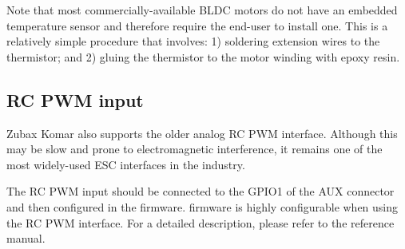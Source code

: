 Note that most commercially-available BLDC motors do not have an embedded temperature sensor and therefore
require the end-user to install one. This is a relatively simple procedure that involves: 1) soldering
extension wires to the thermistor; and 2) gluing the thermistor to the motor winding with epoxy resin.

\subsection{RC PWM input}
Zubax Komar also supports the older analog RC PWM interface. Although this may be slow and prone
to electromagnetic interference, it remains one of the most widely-used ESC interfaces in the industry.

The RC PWM input should be connected to the GPIO1 of the AUX connector and then configured in the firmware.
 firmware is highly configurable when using the RC PWM interface. For a detailed description,
please refer to the  reference manual.
